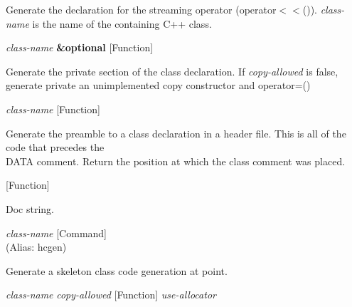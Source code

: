 \begin{doc-string}
Generate the declaration for the streaming operator (operator$<$$<$()).
\emph{class-name} is the name of the containing C++ class.
\end{doc-string}

\vspace{1em}
\noindent
{}
\usebox{\funcname}\emph{class-name} \textbf{\&optional}
 \hfill [Function]
\hspace*{\wd\funcname}

\begin{doc-string}
Generate the private section of the class declaration.  If \emph{copy-allowed}
is false, generate private an unimplemented copy constructor and operator=()
\end{doc-string}

\vspace{1em}
\noindent
{}
\usebox{\funcname}\emph{class-name}
 \hfill [Function]

\begin{doc-string}
Generate the preamble to a class declaration in a header file.  This is all
of the code that precedes the \\ DATA comment.  Return the position at which
the class comment was placed.
\end{doc-string}

\vspace{1em}
\noindent
{}
\usebox{\funcname}
 \hfill [Function]

\begin{doc-string}
Doc string.
\end{doc-string}

\vspace{1em}
\noindent
{}
\usebox{\funcname}\emph{class-name}
 \hfill [Command]\\%
 (Alias: hcgen)

\begin{doc-string}
Generate a skeleton class code generation at point.
\end{doc-string}

\vspace{1em}
\noindent
{}
\usebox{\funcname}\emph{class-name} \emph{copy-allowed}
 \hfill [Function]
\hspace*{\wd\funcname}\emph{use-allocator}

